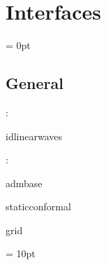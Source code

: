 
\section{Interfaces} 


\parskip = 0pt

\vspace{3mm} \subsection*{General}

: 

idlinearwaves
\vspace{2mm}

: 

admbase

staticconformal

grid
\vspace{2mm}

\vspace{5mm}\parskip = 10pt 
